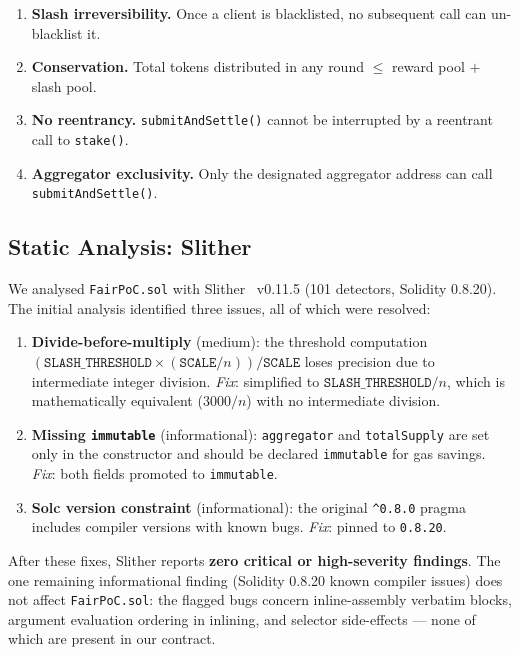 \documentclass[journal]{IEEEtran}
\theoremstyle{definition}
\theoremstyle{remark}
\begin{document}
\begin{enumerate}
  \item \textbf{Slash irreversibility.} Once a client is
        blacklisted, no subsequent call can un-blacklist it.
  \item \textbf{Conservation.} Total tokens distributed in any
        round $\leq$ reward pool $+$ slash pool.
  \item \textbf{No reentrancy.} \texttt{submitAndSettle()} cannot
        be interrupted by a reentrant call to \texttt{stake()}.
  \item \textbf{Aggregator exclusivity.} Only the designated
        aggregator address can call \texttt{submitAndSettle()}.
\end{enumerate}

\subsection{Static Analysis: Slither}

We analysed \texttt{FairPoC.sol} with Slither~\cite{feist2019slither}
v0.11.5 (101 detectors, Solidity 0.8.20).
The initial analysis identified three issues, all of which were resolved:

\begin{enumerate}
  \item \textbf{Divide-before-multiply} (medium): the threshold
        computation $(\mathtt{SLASH\_THRESHOLD} \times (\mathtt{SCALE}/n))
        / \mathtt{SCALE}$ loses precision due to intermediate integer
        division.
        \emph{Fix}: simplified to $\mathtt{SLASH\_THRESHOLD}/n$, which is
        mathematically equivalent ($3000/n$) with no intermediate division.
  \item \textbf{Missing \texttt{immutable}} (informational):
        \texttt{aggregator} and \texttt{totalSupply} are set only in the
        constructor and should be declared \texttt{immutable} for gas
        savings.
        \emph{Fix}: both fields promoted to \texttt{immutable}.
  \item \textbf{Solc version constraint} (informational): the original
        \texttt{\^{}0.8.0} pragma includes compiler versions with known
        bugs.
        \emph{Fix}: pinned to \texttt{0.8.20}.
\end{enumerate}

After these fixes, Slither reports \textbf{zero critical or high-severity
findings}.
The one remaining informational finding (Solidity 0.8.20 known compiler
issues) does not affect \texttt{FairPoC.sol}: the flagged bugs concern
inline-assembly verbatim blocks, argument evaluation ordering in
inlining, and selector side-effects --- none of which are present in
our contract.
\end{document}
